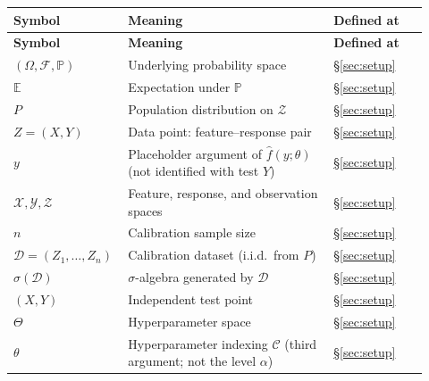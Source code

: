 \documentclass[12pt]{article}
\theoremstyle{plain}
\begin{document}
\begin{center}
\renewcommand{\arraystretch}{1.25}
\begin{longtable}{@{}>{\raggedright\arraybackslash}p{0.22\linewidth}
                  >{\raggedright\arraybackslash}p{0.48\linewidth}
                  >{\raggedright\arraybackslash}p{0.22\linewidth}@{}}
\toprule
\textbf{Symbol} & \textbf{Meaning} & \textbf{Defined at} \\
\midrule
\endfirsthead
\toprule
\textbf{Symbol} & \textbf{Meaning} & \textbf{Defined at} \\
\midrule
\endhead
\bottomrule
\endfoot
\bottomrule
\endlastfoot
\hyperref[def:prob-space]{$(\Omega,\mathcal{F},\mathbb{P})$} &
  Underlying probability space &
  \hyperref[def:prob-space]{\S\ref{sec:setup}} \\
\hyperref[def:prob-space]{$\mathbb{E}$} &
  Expectation under $\mathbb{P}$ &
  \hyperref[def:prob-space]{\S\ref{sec:setup}} \\
\hyperref[def:P]{$P$} &
  Population distribution on $\mathcal{Z}$ &
  \hyperref[def:P]{\S\ref{sec:setup}} \\
\hyperref[def:Zi]{$Z=(X,Y)$} &
  Data point: feature--response pair &
  \hyperref[def:Zi]{\S\ref{sec:setup}} \\
\hyperref[rem:y-vs-Y]{$y$} &
  Placeholder argument of $\hat f(y;\theta)$ (not identified with test $Y$) &
  \hyperref[rem:y-vs-Y]{\S\ref{sec:setup}} \\
\hyperref[def:Zi]{$\mathcal{X},\mathcal{Y},\mathcal{Z}$} &
  Feature, response, and observation spaces &
  \hyperref[def:Zi]{\S\ref{sec:setup}} \\
\hyperref[def:D]{$n$} &
  Calibration sample size &
  \hyperref[def:D]{\S\ref{sec:setup}} \\
\hyperref[def:D]{$\mathcal{D}=(Z_1,\dots,Z_n)$} &
  Calibration dataset (i.i.d.\ from $P$) &
  \hyperref[def:D]{\S\ref{sec:setup}} \\
\hyperref[def:D]{$\sigma(\mathcal{D})$} &
  $\sigma$-algebra generated by $\mathcal{D}$ &
  \hyperref[def:D]{\S\ref{sec:setup}} \\
\hyperref[def:test]{$(X,Y)$} &
  Independent test point &
  \hyperref[def:test]{\S\ref{sec:setup}} \\
\hyperref[def:theta]{$\Theta$} &
  Hyperparameter space &
  \hyperref[def:theta]{\S\ref{sec:setup}} \\
\hyperref[def:theta]{$\theta$} &
  Hyperparameter indexing $\mathcal{C}$ (third argument; not the level $\alpha$) &
  \hyperref[def:theta]{\S\ref{sec:setup}} \\

\end{longtable}
\end{center}
\end{document}
